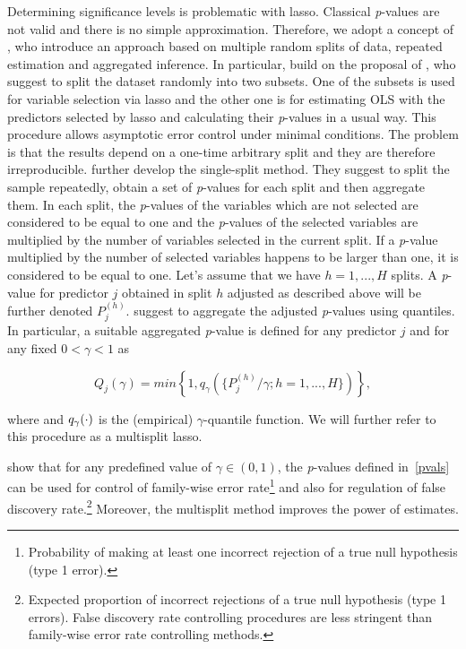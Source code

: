 \documentclass[a4paper,12pt]{article}
\begin{document}
Determining significance levels is problematic with lasso. Classical \textit{p}-values are not valid and there is no simple approximation. Therefore, we adopt a concept of \citet{pValsLasso}, who introduce an approach based on multiple random splits of data, repeated estimation and aggregated inference. In particular, \citet{pValsLasso} build on the proposal of \citet{Wasserman2009}, who suggest to split the dataset randomly into two subsets. One of the subsets is used for variable selection via lasso and the other one is for estimating OLS with the predictors selected by lasso and calculating their \textit{p}-values in a usual way. This procedure allows asymptotic error control under minimal conditions. The problem is that the results depend on a one-time arbitrary split and they are therefore irreproducible. \citet{pValsLasso} further develop the single-split method. They suggest to split the sample repeatedly, obtain a set of \textit{p}-values for each split and then aggregate them. In each split, the \textit{p}-values of the variables which are not selected are considered to be equal to one and the \textit{p}-values of the selected variables are multiplied by the number of variables selected in the current split. If a \textit{p}-value multiplied by the number of selected variables happens to be larger than one, it is considered to be equal to one. Let's assume that we have $h=1,...,H$ splits. A \textit{p}-value for predictor $j$ obtained in split $h$ adjusted as described above will be further denoted $P^{(h)}_j$. \citet{pValsLasso} suggest to aggregate the adjusted \textit{p}-values using quantiles. In particular, a suitable aggregated \textit{p}-value is defined for any predictor $j$ and for any fixed $0<\gamma<1$ as 

\begin{equation}\label{pvals}
Q_j(\gamma)=min \left \{1,q_{\gamma} (   \{ P^{(h)}_j/\gamma; h=1,...,H\}) \right \},
\end{equation}

 where and $q_{\gamma}(\tiny{\cdot})$ is the (empirical) $\gamma$-quantile function. We will further refer to this procedure as a multisplit lasso. 
 
\citet{pValsLasso} show that for any predefined value of $\gamma \in(0,1)$, the \textit{p}-values defined in~\eqref{pvals} can be used for control of family-wise error rate\footnote{Probability of making at least one incorrect rejection of a true null hypothesis (type 1 error).} and also for regulation of false discovery rate.\footnote{Expected proportion of incorrect rejections of a true null hypothesis (type 1 errors). False discovery rate controlling procedures are less stringent than family-wise error rate controlling methods.} Moreover, the multisplit method improves the power of estimates. 
\end{document}

